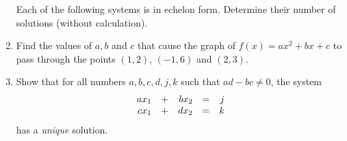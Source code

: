 \begin{enumerate}
 Each of the following systems is in echelon form. Determine their number of
 solutions (without calculation).
 \begin{center}
 \end{center}
\item 
 Find the values of $a,b$ and $c$ that cause the graph of $f(x) = ax^2 + bx + c$
 to pass through the points $(1,2)$, $(-1,6)$ and $(2,3)$.
\item 
 Show that for all numbers $a,b,c,d,j,k$ such that $ad - bc \neq 0$, the system
 \[
  \begin{array}{r c r c r}
   ax_1 & + & bx_2 & = & j\\
   cx_1 & + & dx_2 & = &k
  \end{array}
 \]
 has a \emph{unique} solution.
\end{enumerate}

\section*{}

